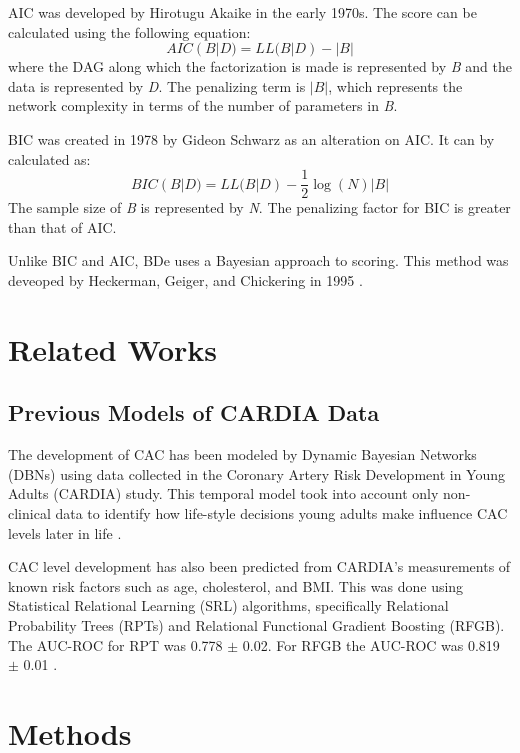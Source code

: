 \documentclass[letterpaper]{article}
\begin{document}
AIC was developed by Hirotugu Akaike \cite{Akaike1974} in the early 1970s. The score can be calculated using the following equation:
\begin{equation}
    AIC(B | D) = LL(B | D) - |B|
\end{equation}
where the DAG along which the factorization is made is represented by \textit{B} and the data is represented by \textit{D}. The penalizing term is \begin{math}|B|\end{math}, which represents the network complexity in terms of the number of parameters in \textit{B}.

BIC was created in 1978 by Gideon Schwarz \cite{Schwarz1978} as an alteration on AIC. It can by calculated as:
\begin{equation}
    BIC(B | D) = LL(B | D) - \frac{1}{2}\log(N)|B|
\end{equation}
  The sample size of \textit{B} is represented by \textit{N}. The penalizing factor for BIC is greater than that of AIC.

Unlike BIC and AIC, BDe uses a Bayesian approach to scoring. This method was deveoped by Heckerman, Geiger, and Chickering in 1995 \cite{Heckerman1995}.

\setcounter{secnumdepth}{3}
\section{Related Works}
\subsection{Previous Models of CARDIA Data}
The development of CAC has been modeled by Dynamic Bayesian Networks (DBNs) using data collected in the Coronary Artery Risk Development in Young Adults (CARDIA) study. This temporal model took into account only non-clinical data to identify how life-style decisions young adults make influence CAC levels later in life \cite{Yang}.

CAC level development has also been predicted from CARDIA's measurements of known risk factors such as age, cholesterol, and BMI. This was done using Statistical Relational Learning (SRL) algorithms, specifically Relational Probability Trees (RPTs) and Relational Functional Gradient Boosting (RFGB). The AUC-ROC for RPT was 0.778 $\pm$ 0.02. For RFGB the AUC-ROC was 0.819 $\pm$ 0.01 \cite{Natarajan2013}. 

\section{Methods}
\end{document}
